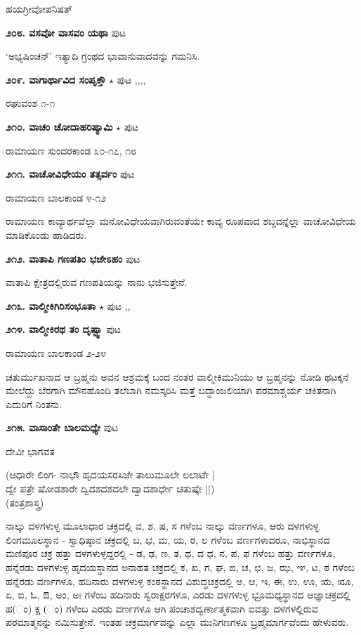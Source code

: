\hfill ಹಯಗ್ರೀವೋಪನಿಷತ್

\medskip
\noindent\textbf{೨೦೮. ವಸವೋ ವಾಸವಂ ಯಥಾ} \hfill ಪುಟ \pageref{250}

\hfill `ಅಭ್ಯಷಿಂಚನ್' ಇತ್ಯಾದಿ ಗ್ರಂಥದ ಭಾವಾನುವಾದವನ್ನು ಗಮನಿಸಿ.

\medskip
\noindent\textbf{೨೦೯. ವಾಗಾರ್ಥಾವಿದ ಸಂಪೃಕ್ತೌ} $\star$ \hfill ಪುಟ \pageref{21},\pageref{31},\pageref{223},\pageref{234},\pageref{238}

\hfill ರಘುವಂಶ ೧-೧

\medskip
\noindent\textbf{೨೧೦. ವಾಚಂ ಚೋದಾಹರಿಷ್ಯಾಮಿ} $\star$ \hfill ಪುಟ \pageref{232}

\hfill ರಾಮಾಯಣ ಸುಂದರಕಾಂಡ ೩೦-೧೭, ೧೮

\medskip
\noindent\textbf{೨೧೧. ವಾಚೋವಿಧೇಯಂ ತತ್ಸರ್ವಂ} \hfill ಪುಟ \pageref{189}

\hfill ರಾಮಾಯಣ ಬಾಲಕಾಂಡ ೪-೧೨

ರಾಮಾಯಣ ಕಾವ್ಯಾರ್ಥವೆಲ್ಲಾ ಮನೋವಿಧೇಯವಾಗಿರುವಂತೆಯೇ ಕಾವ್ಯ ರೂಪವಾದ ಶಬ್ದವನ್ನೆಲ್ಲಾ ವಾಚೋವಿಧೇಯ ಮಾಡಿಕೊಂಡು ಹಾಡಿದರು.

\medskip
\noindent\textbf{೨೧೨. ವಾತಾಪಿ ಗಣಪತಿಂ ಭಜೇಽಹಂ} \hfill ಪುಟ \pageref{45}

\hfill ವಾತಾಪಿ ಕ್ಷೇತ್ರದಲ್ಲಿರುವ ಗಣಪತಿಯನ್ನು ನಾನು ಭಜಿಸುತ್ತೇನೆ.

\medskip
\noindent\textbf{೨೧೩. ವಾಲ್ಮೀಕಿಗಿರಿಸಂಭೂತಾ} $\star$ \hfill ಪುಟ \pageref{151},\pageref{166},\pageref{174}

\medskip
\noindent\textbf{೨೧೪. ವಾಲ್ಮೀಕಿರಥ ತಂ ದೃಷ್ಟ್ವಾ} \hfill ಪುಟ \pageref{202}

\hfill ರಾಮಾಯಣ ಬಾಲಕಾಂಡ ೨-೨೪

ಚತುರ್ಮುಖನಾದ ಆ ಬ್ರಹ್ಮನು ಅವನ ಆಶ್ರಮಕ್ಕೆ ಬಂದ ನಂತರ ವಾಲ್ಮೀಕಿಮುನಿಯು ಆ ಬ್ರಹ್ಮನನ್ನು ನೋಡಿ ಥಟಕ್ಕನೆ ಮೇಲೆದ್ದು ಬೆರಗಾಗಿ ಮೌನಹೊಂದಿ  ತಲೆಬಾಗಿ ನಮಸ್ಕರಿಸಿ ಮತ್ತೆ ಬದ್ಧಾಂಜಲಿಯಾಗಿ ಪರಮಾಶ್ಚರ್ಯ ಚಕಿತನಾಗಿ ಎದುರಿಗೆ ನಿಂತನು.

\medskip
\noindent\textbf{೨೧೫. ವಾಸಾಂತೇ ಬಾಲಮಧ್ಯೇ} \hfill ಪುಟ \pageref{29}

\hfill ದೇವೀ ಭಾಗವತ

\begin{shloka}
(ಆಧಾರೇ ಲಿಂಗ- ನಾಭೌ ಹೃದಯಸರಸಿಜೇ ತಾಲುಮೂಲೇ ಲಲಾಟೇ |\\
ದ್ವೇ ಪತ್ರೇ ಷೋಡಶಾರೇ ದ್ವಿದಶದಶದಲೇ ದ್ವಾದಶಾರ್ಧೇ ಚತುಷ್ಕೇ ||)\\
\hfill (ತಂತ್ರಶಾಸ್ತ್ರ)
\end{shloka}

ನಾಲ್ಕು ದಳಗಳುಳ್ಳ ಮೂಲಾಧಾರ ಚಕ್ರದಲ್ಲಿ ವ, ಶ, ಷ, ಸ ಗಳೆಂಬ ನಾಲ್ಕು ವರ್ಣಗಳೂ,  ಆರು ದಳಗಳುಳ್ಳ ಲಿಂಗಮೂಲಸ್ಥಾನ - ಸ್ವಾಧಿಷ್ಠಾನ ಚಕ್ರದಲ್ಲಿ ಬ, ಭ, ಮ, ಯ, ರ, ಲ ಗಳೆಂಬ ವರ್ಣಗಳಾದರೂ, ನಾಭಿಸ್ಥಾನದ ಮಣಿಪೂರ ಚಕ್ರ ಹತ್ತು ದಳಗಳುಳ್ಳದ್ದರಲ್ಲಿ - ಡ, ಢ, ಣ, ತ, ಥ, ದ ಧ, ನ, ಪ, ಫ ಗಳೆಂಬ ಹತ್ತು ವರ್ಣಗಳೂ, ಹನ್ನೆರಡು ದಳಗಳುಳ್ಳ ಹೃದಯಸ್ಥಾನದ ಅನಾಹತ ಚಕ್ರದಲ್ಲಿ ಕ, ಖ, ಗ, ಘ, ಙ, ಚ, ಛ, ಜ, ಝ, ಞ, ಟ, ಠ ಗಳೆಂಬ ಹನ್ನೆರಡು ವರ್ಣಗಳೂ, ಹದಿನಾರು ದಳಗಳುಳ್ಳ ಕಂಠಸ್ಥಾನದ ವಿಶುದ್ಧಚಕ್ರದಲ್ಲಿ ಅ, ಆ, ಇ, ಈ, ಉ, ಊ, ಋ, ೠ, ಏ, ಐ, ಓ, ಔ, ಅಂ, ಅಃ ಗಳೆಂಬ ಹದಿನಾರು ಸ್ವರಾಕ್ಷರಗಳೂ, ಎರಡು ದಳಗಳುಳ್ಳ ಭ್ರೂಮಧ್ಯಸ್ಥಾನದ ಆಜ್ಞಾಚಕ್ರದಲ್ಲಿ ಹ(ಂ) ಕ್ಷ (ಂ) ಗಳೆಂಬ ಎರಡು ವರ್ಣಗಳೂ ಆಗಿ ಪಂಚಾಶದ್ವರ್ಣಾತ್ಮಕವಾಗಿ ಐವತ್ತು ದಳಗಳಲ್ಲಿರುವ ಪರಮಾತ್ಮನನ್ನು ನಮಿಸುತ್ತೇನೆ. ಇಂತಹ ಚಕ್ರಮಾರ್ಗವನ್ನು ಎಲ್ಲಾ ಮುನಿಗಣಗಳೂ ಬ್ರಹ್ಮಮಾರ್ಗವೆಂದು ಹೇಳುವರು.

